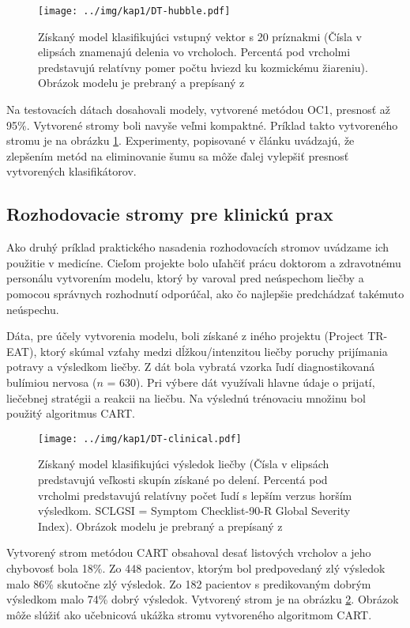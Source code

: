 \begin{figure}[h]
\centering
\centerline{\mbox{\texttt{[image: ../img/kap1/DT-hubble.pdf]}}}
\caption{Získaný model klasifikujúci vstupný vektor s 20 príznakmi (Čísla v elipsách znamenajú delenia vo vrcholoch. Percentá pod vrcholmi predstavujú relatívny pomer počtu hviezd ku kozmickému žiareniu). Obrázok modelu je prebraný a prepísaný z \cite[str. 284]{online-astronomy}}\label{fig:HubbleTree}
\end{figure}

Na testovacích dátach dosahovali modely, vytvorené metódou OC1, presnosť až 95\%. Vytvorené stromy boli navyše veľmi kompaktné. Príklad takto vytvoreného stromu je na obrázku \ref{fig:HubbleTree}. Experimenty, popisované v článku uvádzajú, že zlepšením metód na eliminovanie šumu sa môže ďalej vylepšiť presnosť vytvorených klasifikátorov.

\subsection{Rozhodovacie stromy pre klinickú prax}\label{kap1:2.8:2.8.3:Clinical}
Ako druhý príklad praktického nasadenia rozhodovacích stromov uvádzame ich použitie v medicíne. Cieľom projekte bolo uľahčiť prácu doktorom a zdravotnému personálu vytvorením modelu, ktorý by varoval pred neúspechom liečby a pomocou správnych rozhodnutí odporúčal, ako čo najlepšie predchádzať takémuto neúspechu. 

Dáta, pre účely vytvorenia modelu, boli získané z iného projektu (Project TR-EAT), ktorý skúmal vzťahy medzi dĺžkou/intenzitou liečby poruchy prijímania potravy a výsledkom liečby. Z dát bola vybratá vzorka ľudí diagnostikovaná bulímiou nervosa ($n$ = 630). Pri výbere dát využívali hlavne údaje o prijatí, liečebnej stratégii a reakcii na liečbu. Na výslednú trénovaciu množinu bol použitý algoritmus CART.

\begin{figure}[h]
\centering
\centerline{\mbox{\texttt{[image: ../img/kap1/DT-clinical.pdf]}}}
\caption{Získaný model klasifikujúci výsledok liečby (Čísla v elipsách predstavujú veľkosti skupín získané po delení. Percentá pod vrcholmi predstavujú relatívny počet ľudí s lepším verzus horším výsledkom. SCLGSI = Symptom Checklist-90-R Global Severity Index). Obrázok modelu je prebraný a prepísaný z \cite[s. 454]{online-psychoterapy}}\label{fig:ClinicalTree}
\end{figure}

Vytvorený strom metódou CART obsahoval desať listových vrcholov a jeho chybovosť bola 18\%. Zo 448 pacientov, ktorým bol predpovedaný zlý výsledok malo 86\% skutočne zlý výsledok. Zo 182 pacientov s predikovaným dobrým výsledkom malo 74\% dobrý výsledok. Vytvorený strom je na obrázku \ref{fig:ClinicalTree}. Obrázok môže slúžiť ako učebnicová ukážka stromu vytvoreného algoritmom CART.